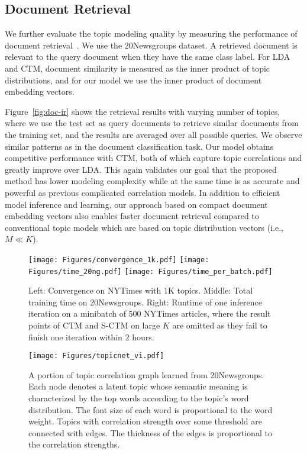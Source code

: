 \documentclass[sigconf]{acmart}
\begin{document}
\subsection{Document Retrieval} \label{sec:ir}
We further evaluate the topic modeling quality by measuring the performance of document retrieval~\cite{hinton2009replicated}. We use the 20Newsgroups dataset. A retrieved document is relevant to the query document when they have the same class label. For LDA and CTM, document similarity is measured as the inner product of topic distributions, and for our model we use the inner product of document embedding vectors.  

Figure~\ref{fig:doc-ir} shows the retrieval results with varying number of topics, where we use the test set as query documents to retrieve similar documents from the training set, and the results are averaged over all possible queries. We observe similar patterns as in the document classification task. Our model obtains competitive performance with CTM, both of which capture topic correlations and greatly improve over LDA. This again validates our goal that the proposed method has lower modeling complexity while at the same time is as accurate and powerful as previous complicated correlation models. 
In addition to efficient model inference and learning, our approach based on compact document embedding vectors also enables faster document retrieval compared to conventional topic models which are based on topic distribution vectors (i.e., $M\ll K$). 

\begin{figure*}[!t]
\begin{center}
\subfigure
{\texttt{[image: Figures/convergence\_1k.pdf]}
}
{\texttt{[image: Figures/time\_20ng.pdf]}
}
{\texttt{[image: Figures/time\_per\_batch.pdf]}
}
\vspace{-15pt}
\caption{Left: Convergence on NYTimes with 1K topics. Middle: Total training time on 20Newsgroups. Right: Runtime of one  inference iteration on a minibatch of 500 NYTimes articles, where the result points of CTM and S-CTM on large $K$ are omitted as they fail to finish one iteration within $2$ hours.}
\label{fig:scale}
\end{center}
\end{figure*}
%
\begin{figure*}[!h]
\begin{center}
\texttt{[image: Figures/topicnet\_vi.pdf]}
\caption{A portion of topic correlation graph learned from 20Newsgroups. Each node denotes a latent topic whose semantic meaning is characterized by the top words according to the topic's word distribution. The font size of each word is proportional to the word weight. Topics with correlation strength over some threshold are connected with edges. The thickness of the edges is proportional to the correlation strengths.}
\label{fig:viz-20news}
\end{center}
\end{figure*}
%
\end{document}
